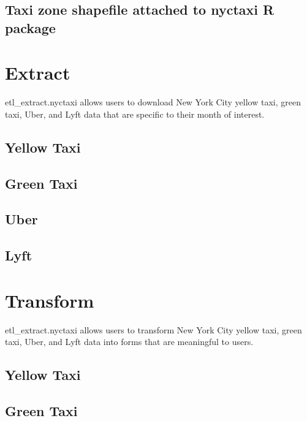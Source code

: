 \documentclass[12pt,twoside]{reedthesis}
\theoremstyle{definition}
\theoremstyle{definition}
\theoremstyle{definition}
\theoremstyle{remark}
\begin{document}
\subsection{Taxi zone shapefile attached to nyctaxi R
package}\label{taxi-zone-shapefile-attached-to-nyctaxi-r-package}

\section{Extract}\label{extract}

etl\_extract.nyctaxi allows users to download New York City yellow taxi,
green taxi, Uber, and Lyft data that are specific to their month of
interest.

\subsection{Yellow Taxi}\label{yellow-taxi-3}

\subsection{Green Taxi}\label{green-taxi-3}

\subsection{Uber}\label{uber-3}

\subsection{Lyft}\label{lyft-3}

\section{Transform}\label{transform}

etl\_extract.nyctaxi allows users to transform New York City yellow
taxi, green taxi, Uber, and Lyft data into forms that are meaningful to
users.

\subsection{Yellow Taxi}\label{yellow-taxi-4}

\subsection{Green Taxi}\label{green-taxi-4}
\end{document}
